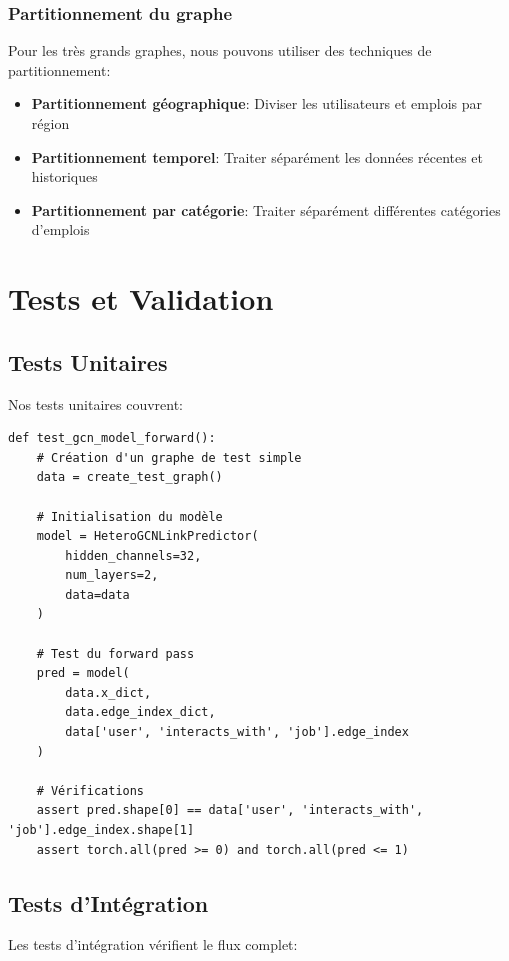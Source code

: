 \documentclass[12pt,a4paper]{article}
\begin{document}
\subsubsection{Partitionnement du graphe}
Pour les très grands graphes, nous pouvons utiliser des techniques de partitionnement:

\begin{itemize}
    \item \textbf{Partitionnement géographique}: Diviser les utilisateurs et emplois par région
    \item \textbf{Partitionnement temporel}: Traiter séparément les données récentes et historiques
    \item \textbf{Partitionnement par catégorie}: Traiter séparément différentes catégories d'emplois
\end{itemize}

\section{Tests et Validation}

\subsection{Tests Unitaires}
Nos tests unitaires couvrent:

\begin{lstlisting}[caption=Exemple de test unitaire pour le modèle GCN]
def test_gcn_model_forward():
    # Création d'un graphe de test simple
    data = create_test_graph()
    
    # Initialisation du modèle
    model = HeteroGCNLinkPredictor(
        hidden_channels=32,
        num_layers=2,
        data=data
    )
    
    # Test du forward pass
    pred = model(
        data.x_dict,
        data.edge_index_dict,
        data['user', 'interacts_with', 'job'].edge_index
    )
    
    # Vérifications
    assert pred.shape[0] == data['user', 'interacts_with', 'job'].edge_index.shape[1]
    assert torch.all(pred >= 0) and torch.all(pred <= 1)
\end{lstlisting}

\subsection{Tests d'Intégration}
Les tests d'intégration vérifient le flux complet:
\end{document}
